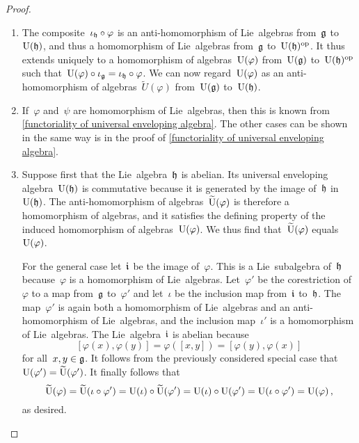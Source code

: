 \begin{proof}
	\leavevmode
	\begin{enumerate}
		\item
			The composite~$\iota_{\mathfrak{h}} \circ \varphi$ is an anti-homomorphism of Lie~algebras from~$\mathfrak{g}$ to~$\operatorname{U}(\mathfrak{h})$, and thus a homomorphism of Lie~algebras from~$\mathfrak{g}$ to~$\operatorname{U}(\mathfrak{h})^{\mathrm{op}}$.
			It thus extends uniquely to a homomorphism of algebras~$\operatorname{U}(\varphi)$ from~$\operatorname{U}(\mathfrak{g})$ to~$\operatorname{U}(\mathfrak{h})^{\mathrm{op}}$ such that~$\operatorname{U}(\varphi) \circ \iota_{\mathfrak{g}} = \iota_{\mathfrak{h}} \circ \varphi$.
			We can now regard~$\operatorname{U}(\varphi)$ as an anti-homomorphism of algebras~$\widetilde{U}(\varphi)$ from~$\operatorname{U}(\mathfrak{g})$ to~$\operatorname{U}(\mathfrak{h})$.
		\item
			If~$\varphi$ and~$\psi$ are homomorphism of Lie~algebras, then this is known from \cref{functoriality of universal enveloping algebra}.
			The other cases can be shown in the same way is in the proof of \cref{functoriality of universal enveloping algebra}.
		\item
			Suppose first that the Lie~algebra~$\mathfrak{h}$ is abelian.
			Its universal enveloping algebra~$\operatorname{U}(\mathfrak{h})$ is commutative because it is generated by the image of~$\mathfrak{h}$ in~$\operatorname{U}(\mathfrak{h})$.
			The anti-homomorphism of algebras~$\widetilde{\operatorname{U}}(\varphi)$ is therefore a homomorphism of algebras, and it satisfies the defining property of the induced homomorphism of algebras~$\operatorname{U}(\varphi)$.
			We thus find that~$\widetilde{\operatorname{U}}(\varphi)$ equals~$\operatorname{U}(\varphi)$.

			For the general case let~$\mathfrak{i}$ be the image of~$\varphi$.
			This is a Lie~subalgebra of~$\mathfrak{h}$ because~$\varphi$ is a homomorphism of Lie~algebras.
			Let~$\varphi'$ be the corestriction of~$\varphi$ to a map from~$\mathfrak{g}$ to~$\varphi'$ and let~$\iota$ be the inclusion map from~$\mathfrak{i}$ to~$\mathfrak{h}$.
			The map~$\varphi'$ is again both a homomorphism of Lie~algebras and an anti-homomorphism of Lie~algebras, and the inclusion map~$\iota'$ is a homomorphism of Lie~algebras.
			The Lie~algebra~$\mathfrak{i}$ is abelian because
			\[
				[\varphi(x), \varphi(y)]
				=
				\varphi( [x,y] )
				=
				[\varphi(y), \varphi(x)]
			\]
			for all~$x, y \in \mathfrak{g}$.
			It follows from the previously considered special case that~$\operatorname{U}(\varphi') = \widetilde{\operatorname{U}}(\varphi')$.
			It finally follows that
			\[
				\widetilde{\operatorname{U}}(\varphi)
				=
				\widetilde{\operatorname{U}}(\iota \circ \varphi')
				=
				\operatorname{U}(\iota) \circ \widetilde{\operatorname{U}}(\varphi')
				=
				\operatorname{U}(\iota) \circ \operatorname{U}(\varphi')
				=
				\operatorname{U}(\iota \circ \varphi')
				=
				\operatorname{U}(\varphi) \,,
			\]
			as desired.
		\qedhere
	\end{enumerate}
\end{proof}


